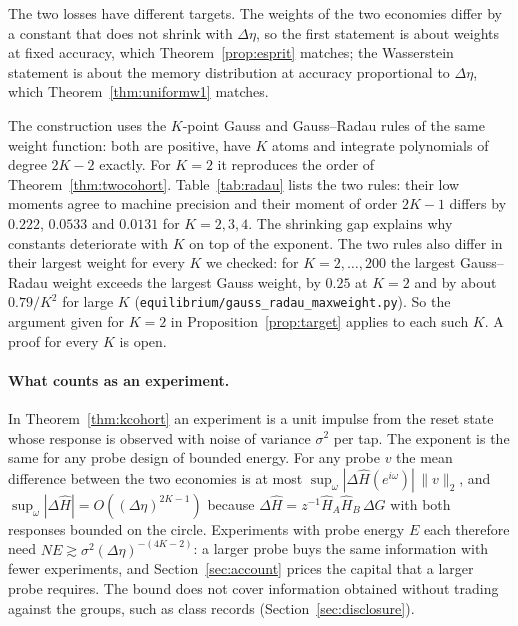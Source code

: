 \documentclass[12pt]{article}
\theoremstyle{definition}
\theoremstyle{remark}
\begin{document}
The two losses have different targets. The weights of the two economies differ by a constant that does not shrink with $\Delta\eta$, so the first statement is about weights at fixed accuracy, which Theorem~\ref{prop:esprit} matches; the Wasserstein statement is about the memory distribution at accuracy proportional to $\Delta\eta$, which Theorem~\ref{thm:uniformw1} matches.

The construction uses the $K$-point Gauss and Gauss--Radau rules of the same weight function: both are positive, have $K$ atoms and integrate polynomials of degree $2K-2$ exactly. For $K=2$ it reproduces the order of Theorem~\ref{thm:twocohort}. Table~\ref{tab:radau} lists the two rules: their low moments agree to machine precision and their moment of order $2K-1$ differs by $0.222$, $0.0533$ and $0.0131$ for $K=2,3,4$. The shrinking gap explains why constants deteriorate with $K$ on top of the exponent. The two rules also differ in their largest weight for every $K$ we checked: for $K=2,\ldots,200$ the largest Gauss--Radau weight exceeds the largest Gauss weight, by $0.25$ at $K=2$ and by about $0.79/K^2$ for large $K$ (\nolinkurl{equilibrium/gauss_radau_maxweight.py}). So the argument given for $K=2$ in Proposition~\ref{prop:target} applies to each such $K$. A proof for every $K$ is open.

\paragraph{What counts as an experiment.} In Theorem~\ref{thm:kcohort} an experiment is a unit impulse from the reset state whose response is observed with noise of variance $\sigma^2$ per tap. The exponent is the same for any probe design of bounded energy. For any probe $v$ the mean difference between the two economies is at most $\sup_\omega|\Delta\hat H(e^{i\omega})|\,\|v\|_2$, and $\sup_\omega|\Delta\hat H|=O((\Delta\eta)^{2K-1})$ because $\Delta\hat H=z^{-1}\hat H_A\hat H_B\,\Delta G$ with both responses bounded on the circle. Experiments with probe energy $E$ each therefore need $NE\gtrsim\sigma^2(\Delta\eta)^{-(4K-2)}$: a larger probe buys the same information with fewer experiments, and Section~\ref{sec:account} prices the capital that a larger probe requires. The bound does not cover information obtained without trading against the groups, such as class records (Section~\ref{sec:disclosure}).
\end{document}
